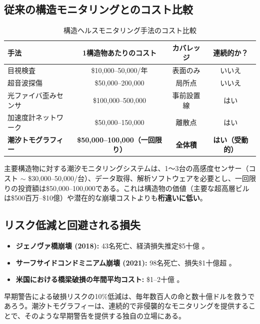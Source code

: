 \documentclass[12pt,a4paper]{article}
\theoremstyle{remark}
\begin{document}
	\subsection{従来の構造モニタリングとのコスト比較}
	
	\begin{table}[htbp]
		\centering
		\caption{構造ヘルスモニタリング手法のコスト比較}
		\label{tab:structural-costs}
		\small
		\begin{tabular}{lccc}
			\toprule
			\textbf{手法} & \textbf{1構造物あたりのコスト} & \textbf{カバレッジ} & \textbf{連続的か？} \\
			\midrule
			目視検査 & \$10,000–50,000/年 & 表面のみ & いいえ \\
			超音波探傷 & \$50,000–200,000 & 局所点 & いいえ \\
			光ファイバ歪みセンサ & \$100,000–500,000 & 事前設置線 & はい \\
			加速度計ネットワーク & \$50,000–150,000 & 離散点 & はい \\
			\textbf{潮汐トモグラフィー} & \textbf{\$50,000–100,000（一回限り）} & \textbf{全体積} & \textbf{はい（受動的）} \\
			\bottomrule
		\end{tabular}
	\end{table}
	
	主要構造物に対する潮汐モニタリングシステムは、1～3台の高感度センサー（コスト \(\sim\) \$30,000–50,000/台）、データ取得、解析ソフトウェアを必要とし、一回限りの投資額は\$50,000–100,000である。これは構造物の価値（主要な超高層ビルは\$500百万–\$10億）や潜在的な崩壊コストよりも\textbf{桁違いに低い}。
	
	\subsection{リスク低減と回避される損失}
	
	\begin{itemize}
		\item \textbf{ジェノヴァ橋崩壊 (2018):} 43名死亡、経済損失推定\$5十億 \cite{Genoa2018}。
		\item \textbf{サーフサイドコンドミニアム崩壊 (2021):} 98名死亡、損失\$1十億超 \cite{Surfside2021}。
		\item \textbf{米国における橋梁破損の年間平均コスト:} \$1–2十億 \cite{ASCE2021}。
	\end{itemize}
	
	早期警告による破損リスクの10\%低減は、毎年数百人の命と数十億ドルを救うであろう。潮汐トモグラフィーは、連続的で非侵襲的なモニタリングを提供することで、そのような早期警告を提供する独自の立場にある。
	
\end{document}

